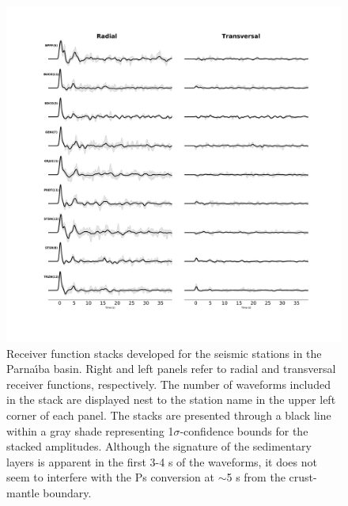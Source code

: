\documentclass[manuscript,11pt]{geophysics}
\begin{document}
\begin{figure}[!ht]
\begin{center}
\includegraphics[width=\textwidth]{Fig/stations_FR.pdf}
\caption{Receiver function stacks developed for the seismic stations in the Parna\'{\i}ba basin. Right and left panels refer to radial and transversal receiver functions, respectively. The number of waveforms included in the stack are displayed nest to the station name in the upper left corner of each panel. The stacks are presented through a black line within a gray shade representing 1$\sigma$-confidence bounds for the stacked amplitudes. Although the signature of the sedimentary layers is apparent in the first 3-4 s of the waveforms, it does not seem to interfere with the Ps conversion at $\sim$5 s from the crust-mantle boundary.}
\label{estations_FR}
\end{center}
\end{figure}
\end{document}
